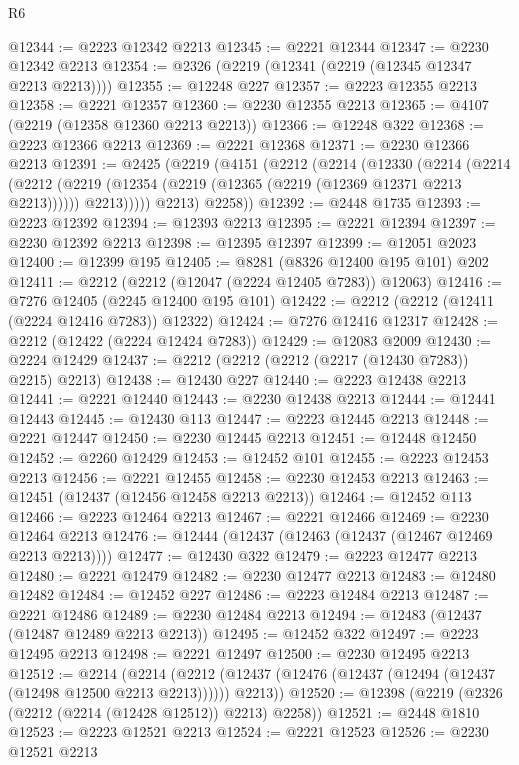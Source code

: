 \begin{lexlean}{R6}
\begin{coremodule}
@12344 := @2223 @12342 @2213
@12345 := @2221 @12344
@12347 := @2230 @12342 @2213
@12354 := @2326 (@2219 (@12341 (@2219 (@12345 @12347 @2213 @2213))))
@12355 := @12248 @227
@12357 := @2223 @12355 @2213
@12358 := @2221 @12357
@12360 := @2230 @12355 @2213
@12365 := @4107 (@2219 (@12358 @12360 @2213 @2213))
@12366 := @12248 @322
@12368 := @2223 @12366 @2213
@12369 := @2221 @12368
@12371 := @2230 @12366 @2213
@12391 := @2425
    (@2219
      (@4151
        (@2212
          (@2214
            (@12330
              (@2214
                (@2214
                  (@2212
                    (@2219 (@12354 (@2219 (@12365 (@2219 (@12369 @12371 @2213 @2213))))))
                    @2213)))))
          @2213)
        @2258))
@12392 := @2448 @1735
@12393 := @2223 @12392
@12394 := @12393 @2213
@12395 := @2221 @12394
@12397 := @2230 @12392 @2213
@12398 := @12395 @12397
@12399 := @12051 @2023
@12400 := @12399 @195
@12405 := @8281 (@8326 @12400 @195 @101) @202
@12411 := @2212 (@2212 (@12047 (@2224 @12405 @7283)) @12063)
@12416 := @7276 @12405 (@2245 @12400 @195 @101)
@12422 := @2212 (@2212 (@12411 (@2224 @12416 @7283)) @12322)
@12424 := @7276 @12416 @12317
@12428 := @2212 (@12422 (@2224 @12424 @7283))
@12429 := @12083 @2009
@12430 := @2224 @12429
@12437 := @2212 (@2212 (@2212 (@2217 (@12430 @7283)) @2215) @2213)
@12438 := @12430 @227
@12440 := @2223 @12438 @2213
@12441 := @2221 @12440
@12443 := @2230 @12438 @2213
@12444 := @12441 @12443
@12445 := @12430 @113
@12447 := @2223 @12445 @2213
@12448 := @2221 @12447
@12450 := @2230 @12445 @2213
@12451 := @12448 @12450
@12452 := @2260 @12429
@12453 := @12452 @101
@12455 := @2223 @12453 @2213
@12456 := @2221 @12455
@12458 := @2230 @12453 @2213
@12463 := @12451 (@12437 (@12456 @12458 @2213 @2213))
@12464 := @12452 @113
@12466 := @2223 @12464 @2213
@12467 := @2221 @12466
@12469 := @2230 @12464 @2213
@12476 := @12444 (@12437 (@12463 (@12437 (@12467 @12469 @2213 @2213))))
@12477 := @12430 @322
@12479 := @2223 @12477 @2213
@12480 := @2221 @12479
@12482 := @2230 @12477 @2213
@12483 := @12480 @12482
@12484 := @12452 @227
@12486 := @2223 @12484 @2213
@12487 := @2221 @12486
@12489 := @2230 @12484 @2213
@12494 := @12483 (@12437 (@12487 @12489 @2213 @2213))
@12495 := @12452 @322
@12497 := @2223 @12495 @2213
@12498 := @2221 @12497
@12500 := @2230 @12495 @2213
@12512 := @2214
    (@2214 (@2212 (@12437 (@12476 (@12437 (@12494 (@12437 (@12498 @12500 @2213 @2213)))))) @2213))
@12520 := @12398 (@2219 (@2326 (@2212 (@2214 (@12428 @12512)) @2213) @2258))
@12521 := @2448 @1810
@12523 := @2223 @12521 @2213
@12524 := @2221 @12523
@12526 := @2230 @12521 @2213

\end{coremodule}
\end{lexlean}
